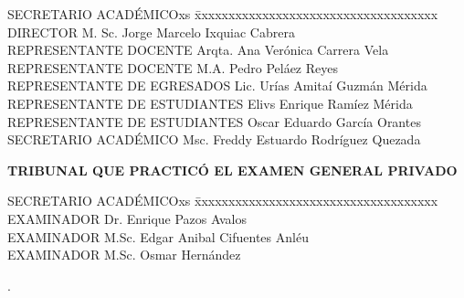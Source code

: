 {\doublespacing{}
\begin{tabbing}
  SECRETARIO ACADÉMICOxs \= xxxxxxxxxxxxxxxxxxxxxxxxxxxxxxxxxxxx  \kill
  DIRECTOR \> \hspace{60pt} M. Sc. Jorge Marcelo Ixquiac Cabrera \\
  REPRESENTANTE DOCENTE \>  \hspace{60pt} Arqta. Ana Verónica Carrera Vela\\
  REPRESENTANTE DOCENTE \>  \hspace{60pt} M.A. Pedro Peláez Reyes\\
  REPRESENTANTE DE EGRESADOS \>  \hspace{60pt} Lic. Urías Amitaí Guzmán Mérida\\
  REPRESENTANTE DE ESTUDIANTES \>  \hspace{60pt} Elivs Enrique Ramíez Mérida\\
  REPRESENTANTE DE ESTUDIANTES \> \hspace{60pt} Oscar Eduardo García Orantes\\
  SECRETARIO ACADÉMICO\>  \hspace{60pt} Msc. Freddy Estuardo Rodríguez Quezada\\
\end{tabbing}

\vspace{24pt}

\begin{center}
\textbf{TRIBUNAL QUE PRACTICÓ EL EXAMEN GENERAL PRIVADO}
\end{center}

\begin{tabbing}
  SECRETARIO ACADÉMICOxs \= xxxxxxxxxxxxxxxxxxxxxxxxxxxxxxxxxxxx  \kill
  EXAMINADOR \> \hspace{60pt} Dr\@. Enrique Pazos Avalos\\
  EXAMINADOR \>  \hspace{60pt} M.Sc. Edgar Anibal Cifuentes Anléu  \\
  EXAMINADOR \>  \hspace{60pt} M.Sc. Osmar Hernández \\
\end{tabbing}
\par}

\newpage
\textcolor[rgb]{1,1,1}{.} 

\thispagestyle{empty}
\newpage